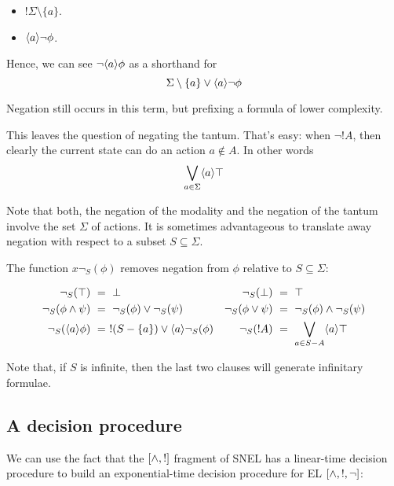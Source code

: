 \begin{itemize}

\item $!\Sigma \setminus \{a\}$.

\item $\langle a \rangle \neg \phi$.

\end{itemize}

\NI Hence, we can see $\neg \langle a \rangle \phi$ as a shorthand for 
\[
   \Sigma \setminus \{a\} \lor \langle a \rangle \neg \phi
\]

\NI Negation still occurs in this term, but prefixing a formula of
lower complexity.

This leaves the question of negating the tantum. That's easy: when
$\neg !A$, then clearly the current state can do an action $a \notin
A$. In other words
\[
   \bigvee_{a \in \Sigma}\langle a \rangle \top
\]

\NI Note that both, the negation of the modality and the negation of
the tantum involve the set $\Sigma$ of actions. It is sometimes
advantageous to translate away negation with respect to a subset $S
\subseteq \Sigma$.

\begin{definition}
The function $x \neg_{S}(\phi)$ removes negation from $\phi$
relative to $S \subseteq \Sigma$:

\begin{align*}
  \neg_{S}(\top) &\ =\  \bot  &
  \neg_S(\bot) &\ =\  \top  \\
  \neg_S(\phi \land \psi) &\ =\  \neg_S(\phi) \lor \neg_S(\psi)  &
  \neg_S(\phi \lor \psi) &\ =\  \neg_S(\phi) \land \neg_S(\psi)  \\
  \neg_S(\langle a \rangle \phi) &\ =\  !(S-\{a\}) \lor \langle a \rangle \neg_S(\phi)  &
  \neg_S(! A) &\ =\  \bigvee_{a \in S - A} \langle a \rangle \top
\end{align*}


\end{definition}

\NI Note that, if $S$ is infinite, then the last two clauses will
generate infinitary formulae.

\subsection{A decision procedure}

\NI We can use the fact that the $[\land, !]$ fragment of SNEL
has a linear-time decision procedure to build an exponential-time
decision procedure for EL $[\land, !, \neg]$:

